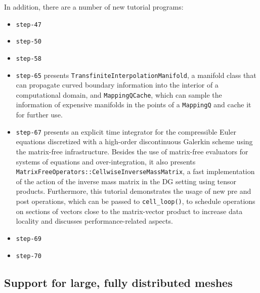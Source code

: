 \documentclass{ansarticle-preprint}
\begin{document}
In addition, there are a number of new tutorial programs:
\begin{itemize}
\item \texttt{step-47}
\item \texttt{step-50}
\item \texttt{step-58}
\item \texttt{step-65} presents \texttt{TransfiniteInterpolationManifold}, a
manifold class that can propagate curved boundary information into the
interior of a computational domain, and \texttt{MappingQCache}, which can sample 
the information of expensive manifolds in the points of a \texttt{MappingQ} and 
cache it for further use.
\item \texttt{step-67} presents an explicit time integrator for the
compressible Euler equations discretized with a high-order discontinuous
Galerkin scheme using the matrix-free infrastructure. Besides the use of
matrix-free evaluators for systems of equations and over-integration, it also
presents \texttt{MatrixFreeOperators::CellwiseInverseMassMatrix}, a fast implementation
of the action of the inverse mass matrix in the DG setting using tensor
products. Furthermore, this tutorial demonstrates the usage of new 
pre and post operations, which can be passed to \texttt{cell\_loop()}, to schedule operations on sections of vectors close 
to the matrix-vector product to increase data locality 
and discusses performance-related aspects.
\item \texttt{step-69}
\item \texttt{step-70}
\end{itemize}


\subsection{Support for large, fully distributed meshes}
\label{subsec:pfT}




\end{document}
